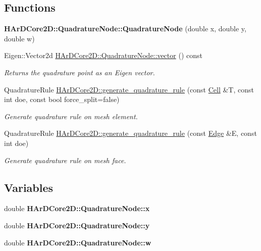\subsection*{Functions}
\begin{DoxyCompactItemize}
\item 
\mbox{\label{group__Quadratures_gae76e5c50d31061d72d153133718428bb}} 
{\bfseries H\+Ar\+D\+Core2\+D\+::\+Quadrature\+Node\+::\+Quadrature\+Node} (double x, double y, double w)
\item 
\mbox{\label{group__Quadratures_ga27f8f3696a0be686ed1606dda2425da6}} 
Eigen\+::\+Vector2d \hyperlink{group__Quadratures_ga27f8f3696a0be686ed1606dda2425da6}{H\+Ar\+D\+Core2\+D\+::\+Quadrature\+Node\+::vector} () const
\begin{DoxyCompactList}\small\item\em Returns the quadrature point as an Eigen vector. \end{DoxyCompactList}\item 
Quadrature\+Rule \hyperlink{group__Quadratures_gad8f643134b5bea1e323e14c5ac42aa74}{H\+Ar\+D\+Core2\+D\+::generate\+\_\+quadrature\+\_\+rule} (const \hyperlink{classHArDCore2D_1_1Cell}{Cell} \&T, const int doe, const bool force\+\_\+split=false)
\begin{DoxyCompactList}\small\item\em Generate quadrature rule on mesh element. \end{DoxyCompactList}\item 
Quadrature\+Rule \hyperlink{group__Quadratures_ga5e1f7c48ac0530bcb24e590a729bf3db}{H\+Ar\+D\+Core2\+D\+::generate\+\_\+quadrature\+\_\+rule} (const \hyperlink{classHArDCore2D_1_1Edge}{Edge} \&E, const int doe)
\begin{DoxyCompactList}\small\item\em Generate quadrature rule on mesh face. \end{DoxyCompactList}\end{DoxyCompactItemize}
\subsection*{Variables}
\begin{DoxyCompactItemize}
\item 
\mbox{\label{group__Quadratures_ga628eb81f57259847bbc6250bc2fc7a47}} 
double {\bfseries H\+Ar\+D\+Core2\+D\+::\+Quadrature\+Node\+::x}
\item 
\mbox{\label{group__Quadratures_gabd7b50c9a348283e18d94c9e4dba8982}} 
double {\bfseries H\+Ar\+D\+Core2\+D\+::\+Quadrature\+Node\+::y}
\item 
\mbox{\label{group__Quadratures_ga5ff899e851df60680e721740e4176fc0}} 
double {\bfseries H\+Ar\+D\+Core2\+D\+::\+Quadrature\+Node\+::w}
\end{DoxyCompactItemize}


